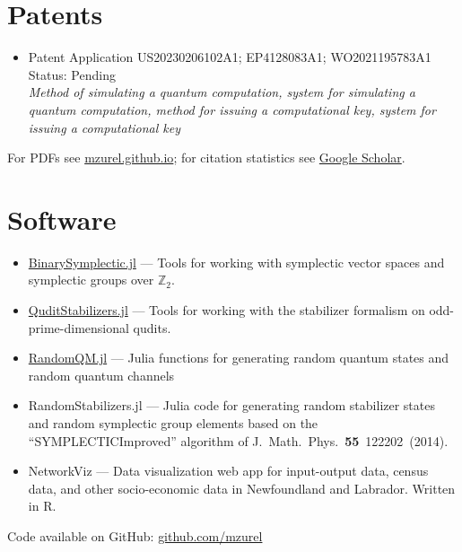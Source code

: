 \documentclass[letterpaper,11pt]{article}
\newcommand{\ConferenceItemII}[3]{
	\item{\parbox{0.97\textwidth}{
		{#1}  \hfill {#2}\\
		\emph{#3}
	}}
}
\begin{document}
\section*{Patents}
\begin{itemize}[leftmargin=*]
	\ConferenceItemII{Patent Application US20230206102A1; EP4128083A1; WO2021195783A1}{Status: Pending}{Method of simulating a quantum computation, system for simulating a quantum computation, method for issuing a computational key, system for issuing a computational key}
\end{itemize}

\nocite{ZurelRaussendorf2024,ZurelHeimendahl2024b,ZurelHeimendahl2024a,ZurelCohenRaussendorf2023,RaussendorfFeldmann2023,OkayRaussendorf2021,ZurelRaussendorf2020,RaussendorfZurel2020}
\printbibliography[title={Publications \& preprints}]
For PDFs see \href{https://mzurel.github.io}{mzurel.github.io}; for citation statistics see \href{https://scholar.google.com/citations?user=qUA_szUAAAAJ&hl=en&oi=ao}{Google Scholar}.

\section*{Software}
\begin{itemize}[leftmargin=*]
	\item \href{https://github.com/mzurel/BinarySymplectic.jl}{BinarySymplectic.jl} --- Tools for working with symplectic vector spaces and symplectic groups over $\mathbb{Z}_2$.
	\vspace{-4pt}
	\item \href{https://github.com/mzurel/QuditStabilizers.jl}{QuditStabilizers.jl} --- Tools for working with the stabilizer formalism on odd-prime-dimensional qudits.
	\vspace{-4pt}
	\item \href{https://github.com/mzurel/RandomQM.jl}{RandomQM.jl} --- Julia functions for generating random quantum states and random quantum channels
	\vspace{-4pt}
	\item %
	RandomStabilizers.jl --- Julia code for generating random stabilizer states and random symplectic group elements based on the ``SYMPLECTICImproved'' algorithm of J.~Math.~Phys.~\textbf{55}~122202~(2014).
	\vspace{-4pt}
	\item NetworkViz --- Data visualization web app for input-output data, census data, and other socio-economic data in Newfoundland and Labrador.  Written in R.
	\vspace{-4pt}
\end{itemize}
Code available on GitHub: \href{https://github.com/mzurel}{github.com/mzurel}
\end{document}
